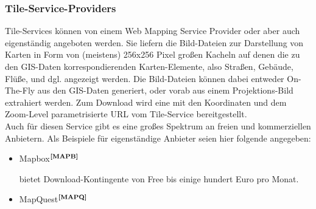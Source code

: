 \subsubsection{Tile-Service-Providers}
Tile-Services können von einem Web Mapping Service Provider oder aber auch eigenständig angeboten werden. Sie liefern die Bild-Dateien zur Darstellung von Karten in Form von (meistens) 256x256 Pixel großen Kacheln auf denen die zu den GIS-Daten korrespondierenden Karten-Elemente, also Straßen, Gebäude, Flüße, und dgl. angezeigt werden. Die Bild-Dateien können dabei entweder On-The-Fly aus den GIS-Daten generiert, oder vorab aus einem Projektions-Bild extrahiert werden. Zum Download wird eine mit den Koordinaten und dem Zoom-Level parametrisierte URL vom Tile-Service bereitgestellt.\\
Auch für diesen Service gibt es eine großes Spektrum an freien und kommerziellen Anbietern. Als Beispiele für eigenständige Anbieter seien hier folgende angegeben: 
\begin{itemize}
  \item Mapbox$^{\textbf{\ref{MAPB}}}$
\addtocounter{footnote}{1}%
%
bietet Download-Kontingente von Free bis einige hundert Euro pro Monat.
  \item MapQuest$^{\textbf{\ref{MAPQ}}}$
\addtocounter{footnote}{1}
\end{itemize}

